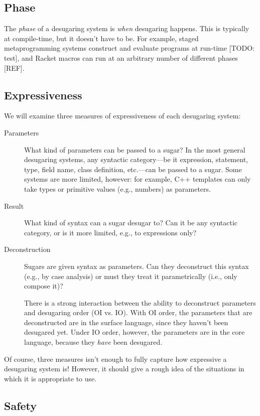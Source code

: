 \subsection{Phase}

The \emph{phase} of a desugaring system is \emph{when} desugaring
happens. This is typically at compile-time, but it doesn't have to be.
For example, staged metaprogramming systems construct and evaluate
programs at run-time [TODO: test], and Racket macros can run at an
arbitrary number of different phases [REF].

\subsection{Expressiveness}

We will examine three measures of expressiveness of each desugaring
system:
\begin{description}
\item[Parameters] What kind of parameters can be passed to a sugar? In
  the most general desugaring systems, any syntactic category---be it
  expression, statement, type, field name, class definition,
  etc.---can be passed to a sugar. Some systems are more limited,
  however: for example, C++ templates can only take types or primitive
  values (e.g., numbers) as parameters.
\item[Result] What kind of syntax can a sugar desugar to? Can it be
  any syntactic category, or is it more limited, e.g., to expressions
  only?
\item[Deconstruction] Sugars are given syntax as parameters. Can they
  deconstruct this syntax (e.g., by case analysis) or must
  they treat it parametrically (i.e., only compose it)?

  There is a strong interaction between the ability to deconstruct
  parameters and desugaring order (OI vs. IO). With OI order, the
  parameters that are deconstructed are in the surface language, since
  they haven't been desugared yet. Under IO order, however, the
  parameters are in the core language, because they \emph{have} been
  desugared.
\end{description}
Of course, three measures isn't enough to fully capture how expressive
a desugaring system is! However, it should give a rough idea of the
situations in which it is appropriate to use.


\subsection{Safety}\label{sec:taxonomy-safety}

